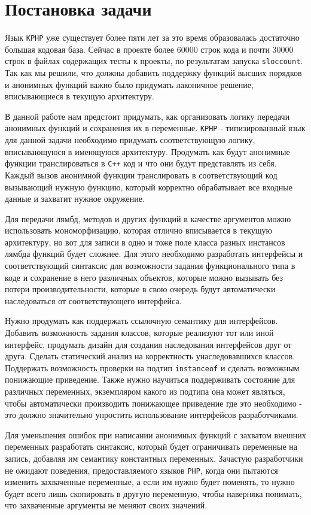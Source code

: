 
\chapter{Постановка задачи}
Язык \verb|KPHP| уже существует более пяти лет за это время образовалась достаточно большая кодовая база.
Сейчас в проекте более 60000 строк кода и почти 30000 строк в файлах содержащих тесты к проекты, по результатам запуска \verb|sloccount|\cite{sloccount}. Так как мы решили, что должны добавить поддержку функций высших порядков и анонимных функций важно было придумать лаконичное решение, вписывающиеся в текущую архитектуру.

В данной работе нам предстоит придумать, как организовать логику передачи анонимных функций и сохранения их в переменные. \verb|KPHP| - типизированный язык для данной задачи необходимо придумать соответствующую логику, вписывающуюся в имеющуюся архитектуру. Продумать как будут анонимные функции транслироваться в \verb|C++| код и что они будут представлять из себя. Каждый вызов анонимной функции транслировать в соответствующий код вызывающий нужную функцию, который корректно обрабатывает все входные данные и захватит нужное окружение.

Для передачи лямбд, методов и других функций в качестве аргументов можно использовать мономорфизацию, которая отлично вписывается в текущую архитектуру, но вот для записи в одно и тоже поле класса разных инстансов лямбда функций будет сложнее. Для этого необходимо разработать интерфейсы и соответствующий синтаксис для возможности задания функционального типа в коде и сохранение в него различных объектов, которые можно вызывать без потери производительности, которые в свою очередь будут автоматически наследоваться от соответствующего интерфейса. 

Нужно продумать как поддержать ссылочную семантику для интерфейсов. Добавить возможность задания классов, которые реализуют тот или иной интерфейс, продумать дизайн для создания наследования интерфейсов друг от друга. Сделать статический анализ на корректность унаследовавшихся классов. Поддержать возможность проверки на подтип \verb|instanceof| и сделать возможным понижающие приведение. Также нужно научиться поддерживать состояние для различных переменных, экземпляром какого из подтипа она может являться, чтобы автоматически производить понижающее приведение где это необходимо - это должно значительно упростить использование интерфейсов разработчиками.

Для уменьшения ошибок при написании анонимных функций с захватом внешних переменных разработать синтаксис, который будет ограничивать переменные на запись, добавляя им семантику константных переменных. Зачастую разработчики не ожидают поведения, предоставляемого языков \verb|PHP|, когда они пытаются изменить захваченные переменные, а если им нужно будет поменять, то нужно будет всего лишь скопировать в другую переменную, чтобы наверняка понимать, что захваченные аргументы не меняют своих значений.

